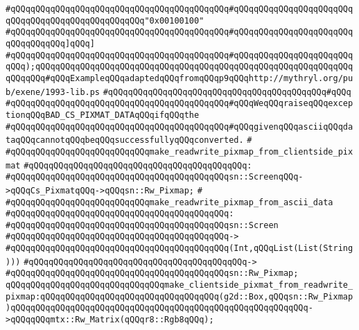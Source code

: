 \verb|#qQQqqQQqqQQqqQQqqQQqqQQqqQQqqQQqqQQqqQQqqQQq#qQQqqQQqqQQqqQQqqQQqqQQqqQQqqQQqqQQqqQQqqQQqqQQqqQQq"0x00100100"|\newline
\verb|#qQQqqQQqqQQqqQQqqQQqqQQqqQQqqQQqqQQqqQQqqQQq#qQQqqQQqqQQqqQQqqQQqqQQqqQQqqQQqqQQq]qQQq]|\newline
\verb|#qQQqqQQqqQQqqQQqqQQqqQQqqQQqqQQqqQQqqQQqqQQq#qQQqqQQqqQQqqQQqqQQqqQQqqQQq);qQQqqQQqqQQqqQQqqQQqqQQqqQQqqQQqqQQqqQQqqQQqqQQqqQQqqQQqqQQqqQQqqQQqqQQq#qQQqExampleqQQqadaptedqQQqfromqQQqp9qQQqhttp://mythryl.org/pub/exene/1993-lib.ps|\newline
\verb|#qQQqqQQqqQQqqQQqqQQqqQQqqQQqqQQqqQQqqQQqqQQq#qQQq|\newline
\verb|#qQQqqQQqqQQqqQQqqQQqqQQqqQQqqQQqqQQqqQQqqQQq#qQQqWeqQQqraiseqQQqexceptionqQQqBAD_CS_PIXMAT_DATAqQQqifqQQqthe|\newline
\verb|#qQQqqQQqqQQqqQQqqQQqqQQqqQQqqQQqqQQqqQQqqQQq#qQQqgivenqQQqasciiqQQqdataqQQqcannotqQQqbeqQQqsuccessfullyqQQqconverted.|\newline
\verb|#|\newline
\verb|#qQQqqQQqqQQqqQQqqQQqqQQqqQQqmake_readwrite_pixmap_from_clientside_pixmat|\newline
\verb|#qQQqqQQqqQQqqQQqqQQqqQQqqQQqqQQqqQQqqQQqqQQq:|\newline
\verb|#qQQqqQQqqQQqqQQqqQQqqQQqqQQqqQQqqQQqqQQqqQQqsn::ScreenqQQq->qQQqCs_PixmatqQQq->qQQqsn::Rw_Pixmap;|\newline
\verb|#|\newline
\verb|#qQQqqQQqqQQqqQQqqQQqqQQqqQQqmake_readwrite_pixmap_from_ascii_data|\newline
\verb|#qQQqqQQqqQQqqQQqqQQqqQQqqQQqqQQqqQQqqQQqqQQq:|\newline
\verb|#qQQqqQQqqQQqqQQqqQQqqQQqqQQqqQQqqQQqqQQqqQQqsn::Screen|\newline
\verb|#qQQqqQQqqQQqqQQqqQQqqQQqqQQqqQQqqQQqqQQqqQQq->|\newline
\verb|#qQQqqQQqqQQqqQQqqQQqqQQqqQQqqQQqqQQqqQQqqQQq(Int,qQQqList(List(String)))|\newline
\verb|#qQQqqQQqqQQqqQQqqQQqqQQqqQQqqQQqqQQqqQQqqQQq->|\newline
\verb|#qQQqqQQqqQQqqQQqqQQqqQQqqQQqqQQqqQQqqQQqqQQqsn::Rw_Pixmap;|\newline
\newline
\verb|qQQqqQQqqQQqqQQqqQQqqQQqqQQqqQQqmake_clientside_pixmat_from_readwrite_pixmap:qQQqqQQqqQQqqQQqqQQqqQQqqQQqqQQqqQQq(g2d::Box,qQQqsn::Rw_Pixmap)qQQqqQQqqQQqqQQqqQQqqQQqqQQqqQQqqQQqqQQqqQQqqQQqqQQqqQQqqQQq->qQQqqQQqmtx::Rw_Matrix(qQQqr8::Rgb8qQQq);|\newline
